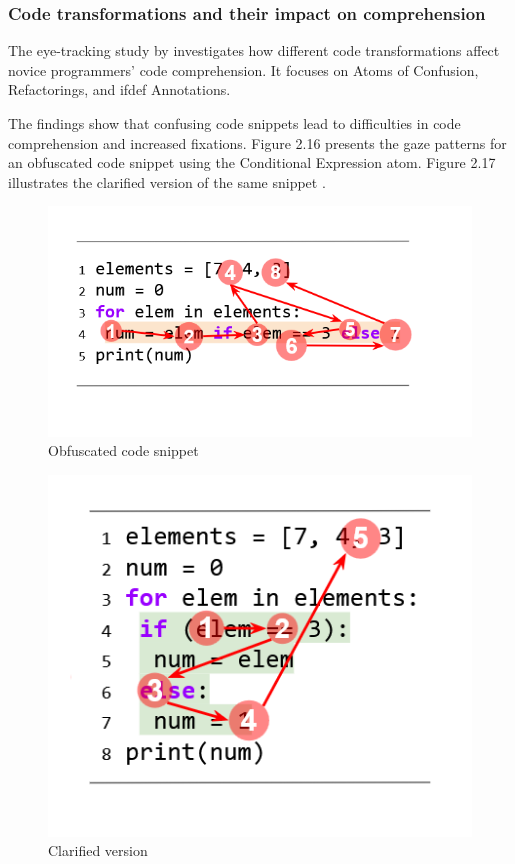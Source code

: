 \subsubsection{Code transformations and their impact on comprehension}
The eye-tracking study by \citet{silva2023evaluating} investigates how different code transformations affect novice programmers’ code comprehension. It focuses on Atoms of Confusion, Refactorings, and ifdef Annotations. 

The findings show that confusing code snippets lead to difficulties in code comprehension and increased fixations. Figure 2.16 presents the gaze patterns for an obfuscated code snippet using the Conditional Expression atom. Figure 2.17 illustrates the clarified version of the same snippet \cite{silva2023evaluating}. 
 

\begin{figure} [H]
  \centering
  \includegraphics[scale=0.8]{figures/a.png}
  \caption{Obfuscated code snippet \cite[p. 5]{silva2023evaluating}}
  \label{fig:AnhangsChor}
\end{figure}

\begin{figure} [H]
  \centering
  \includegraphics[scale=0.8]{figures/b.png}
  \caption{Clarified version \cite[p. 5]{silva2023evaluating}}
  \label{fig:AnhangsChor}
\end{figure}


